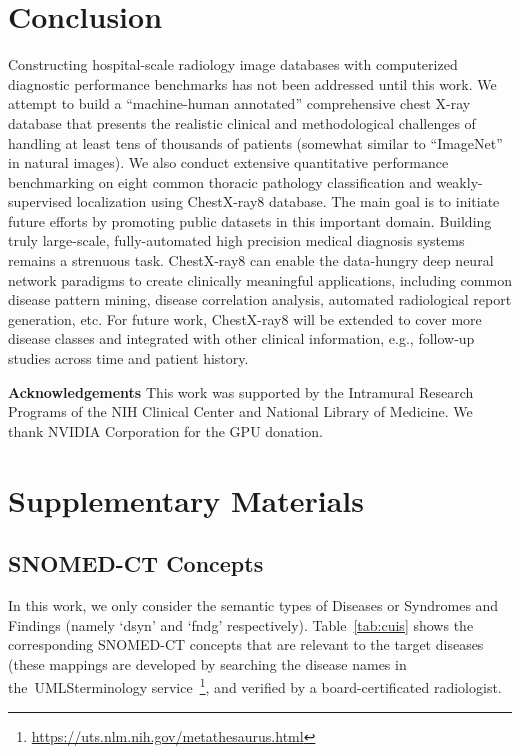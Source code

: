 \documentclass[10pt,twocolumn,letterpaper]{article}
\newcommand{\umls}{UMLS\textsuperscript{\textregistered}}
\begin{document}
\section{Conclusion}%
Constructing hospital-scale radiology image databases with computerized diagnostic performance benchmarks has not been addressed until this work. We attempt to build a ``machine-human annotated'' comprehensive chest X-ray database that presents the realistic clinical and methodological challenges of handling at least tens of thousands of patients (somewhat similar to ``ImageNet'' in natural images). We also conduct extensive quantitative performance benchmarking on eight common thoracic pathology classification and weakly-supervised localization using ChestX-ray8 database. The main goal is to initiate future efforts by promoting public datasets in this important domain. Building truly large-scale, fully-automated high precision medical diagnosis systems remains a strenuous task. ChestX-ray8 can enable the data-hungry deep neural network paradigms to create clinically meaningful applications, including common disease pattern mining, disease correlation analysis, automated radiological report generation, etc. For future work, ChestX-ray8 will be extended to cover more disease classes and integrated with other clinical information, e.g., follow-up studies across time and patient history. 


{\bf Acknowledgements  } This work was supported by the Intramural Research Programs of the NIH Clinical Center and National Library of Medicine. We thank NVIDIA Corporation for the GPU donation.

{\small


}
\vspace{130mm}

\appendix

\section{Supplementary Materials}
\subsection{SNOMED-CT Concepts}
In this work, we only consider the semantic types of Diseases or Syndromes and Findings (namely `dsyn' and `fndg' respectively). Table~\ref{tab:cuis} shows the corresponding SNOMED-CT concepts that are relevant to the target diseases (these mappings are developed by searching the disease names in the~\umls terminology service~\footnote{\url{https://uts.nlm.nih.gov/metathesaurus.html}}, and verified by a board-certificated radiologist.
\end{document}
